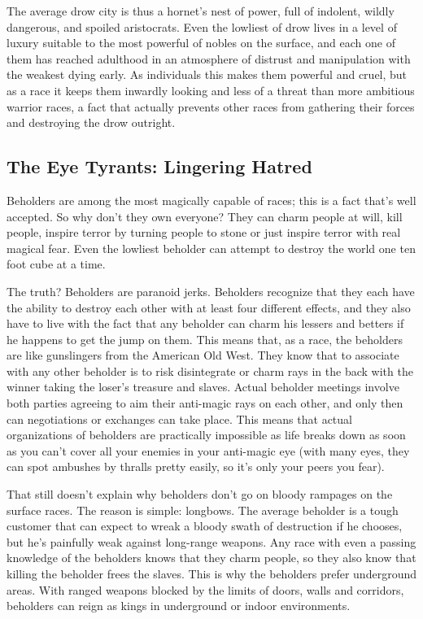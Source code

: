 The average drow city is thus a hornet's nest of power, full of indolent, wildly dangerous, and spoiled aristocrats. Even the lowliest of drow lives in a level of luxury suitable to the most powerful of nobles on the surface, and each one of them has reached adulthood in an atmosphere of distrust and manipulation with the weakest dying early. As individuals this makes them powerful and cruel, but as a race it keeps them inwardly looking and less of a threat than more ambitious warrior races, a fact that actually prevents other races from gathering their forces and destroying the drow outright.

\subsection{The Eye Tyrants: Lingering Hatred}

Beholders are among the most magically capable of races; this is a fact that's well accepted. So why don't they own everyone? They can charm people at will, kill people, inspire terror by turning people to stone or just inspire terror with real magical fear. Even the lowliest beholder can attempt to destroy the world one ten foot cube at a time.

The truth? Beholders are paranoid jerks. Beholders recognize that they each have the ability to destroy each other with at least four different effects, and they also have to live with the fact that any beholder can charm his lessers and betters if he happens to get the jump on them. This means that, as a race, the beholders are like gunslingers from the American Old West. They know that to associate with any other beholder is to risk disintegrate or charm rays in the back with the winner taking the loser's treasure and slaves. Actual beholder meetings involve both parties agreeing to aim their anti-magic rays on each other, and only then can negotiations or exchanges can take place. This means that actual organizations of beholders are practically impossible as life breaks down as soon as you can't cover all your enemies in your anti-magic eye (with many eyes, they can spot ambushes by thralls pretty easily, so it's only your peers you fear).

That still doesn't explain why beholders don't go on bloody rampages on the surface races. The reason is simple: longbows. The average beholder is a tough customer that can expect to wreak a bloody swath of destruction if he chooses, but he's painfully weak against long-range weapons. Any race with even a passing knowledge of the beholders knows that they charm people, so they also know that killing the beholder frees the slaves. This is why the beholders prefer underground areas. With ranged weapons blocked by the limits of doors, walls and corridors, beholders can reign as kings in underground or indoor environments.

